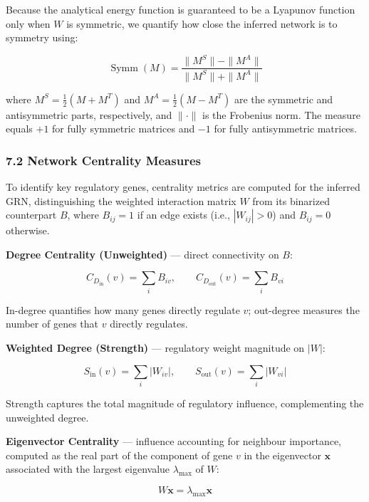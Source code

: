 \documentclass[11pt]{article}
\begin{document}
Because the analytical energy function is guaranteed to be a Lyapunov function only when $W$ is symmetric, we quantify how close the inferred network is to symmetry using:


\begin{equation}
\operatorname{Symm}(M) = \frac{\|M^S\| - \|M^A\|}{\|M^S\| + \|M^A\|} 
\end{equation}


where $M^S = \frac{1}{2}(M + M^T)$ and $M^A = \frac{1}{2}(M - M^T)$ are the symmetric and antisymmetric parts, respectively, and $\|\cdot\|$ is the Frobenius norm. The measure equals $+1$ for fully symmetric matrices and $-1$ for fully antisymmetric matrices.


\subsubsection*{7.2 Network Centrality Measures}

To identify key regulatory genes, centrality metrics are computed for the inferred GRN, distinguishing the weighted interaction matrix $W$ from its binarized counterpart $B$, where $B_{ij} = 1$ if an edge exists (i.e., $|W_{ij}| > 0$) and $B_{ij} = 0$ otherwise.

\textbf{Degree Centrality (Unweighted)} — direct connectivity on $B$:

\begin{equation}
C_{D_{\text{in}}}(v) = \sum_i B_{iv}, \qquad C_{D_{\text{out}}}(v) = \sum_i B_{vi} 
\end{equation}


In-degree quantifies how many genes directly regulate $v$; out-degree measures the number of genes that $v$ directly regulates.

\textbf{Weighted Degree (Strength)} — regulatory weight magnitude on $|W|$:

\begin{equation}
S_{\text{in}}(v) = \sum_i |W_{iv}|, \qquad S_{\text{out}}(v) = \sum_i |W_{vi}| 
\end{equation}


Strength captures the total magnitude of regulatory influence, complementing the unweighted degree.

\textbf{Eigenvector Centrality} — influence accounting for neighbour importance, computed as the real part of the component of gene $v$ in the eigenvector $\mathbf{x}$ associated with the largest eigenvalue $\lambda_{\max}$ of $W$:

\begin{equation}
W\mathbf{x} = \lambda_{\max}\mathbf{x} 
\end{equation}
\end{document}
